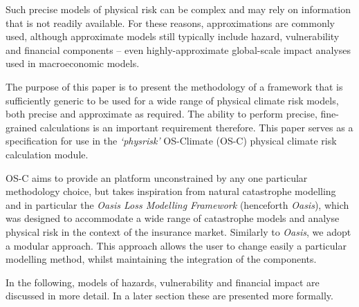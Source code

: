 \documentclass{article}
\begin{document}
Such precise models of physical risk can be complex and may rely on information that is not readily available. For these reasons, approximations are commonly used, although approximate models still typically include hazard, vulnerability and financial components \cite{BertramEtAl:2020}\cite{WoetzelEtAl:2020} -- even highly-approximate global-scale impact analyses used in macroeconomic models.

The purpose of this paper is to present the methodology of a framework that is sufficiently generic to be used for a wide range of physical climate risk models, both precise and approximate as required. The ability to perform precise, fine-grained calculations is an important requirement therefore. This paper serves as a specification for use in the \emph{`physrisk'} OS-Climate (OS-C) \cite{OSC} physical climate risk calculation module.

OS-C aims to provide an platform unconstrained by any one particular methodology choice, but takes inspiration from natural catastrophe modelling \cite{MitchellEtAl:2017} and in particular the \emph{Oasis Loss Modelling Framework} \cite{OasisLMF} (henceforth \emph{Oasis}), which was designed to accommodate a wide range of catastrophe models and analyse physical risk in the context of the insurance market. Similarly to \emph{Oasis}, we adopt a modular approach. This approach allows the user to change easily a particular modelling method, whilst maintaining the integration of the components. 

In the following, models of hazards, vulnerability and financial impact are discussed in more detail. In a later section these are presented more formally.
\end{document}
